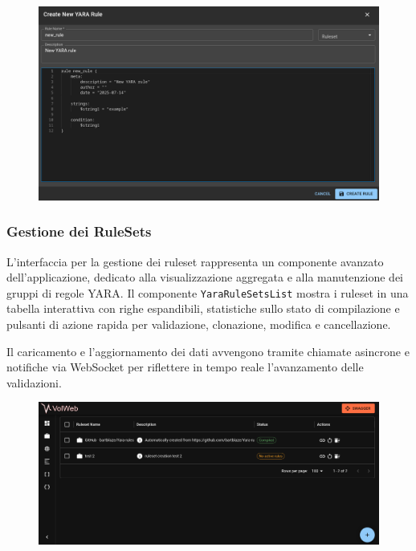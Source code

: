 \begin{figure}[H]
\centering
\includegraphics[width=1\linewidth]{images/volweb-esteso/volweb-creation-dialog.png}
\end{figure}

\subsubsection{Gestione dei RuleSets}

L'interfaccia per la gestione dei ruleset rappresenta un componente avanzato dell'applicazione, dedicato alla visualizzazione aggregata e alla manutenzione dei gruppi di regole YARA. Il componente \texttt{YaraRuleSetsList} mostra i ruleset in una tabella interattiva con righe espandibili, statistiche sullo stato di compilazione e pulsanti di azione rapida per validazione, clonazione, modifica e cancellazione. 

Il caricamento e l’aggiornamento dei dati avvengono tramite chiamate asincrone e notifiche via WebSocket per riflettere in tempo reale l’avanzamento delle validazioni.

\begin{figure}[H]
\centering
\includegraphics[width=1\linewidth]{images/volweb-esteso/volweb-rulesetlist.png}
\end{figure}


